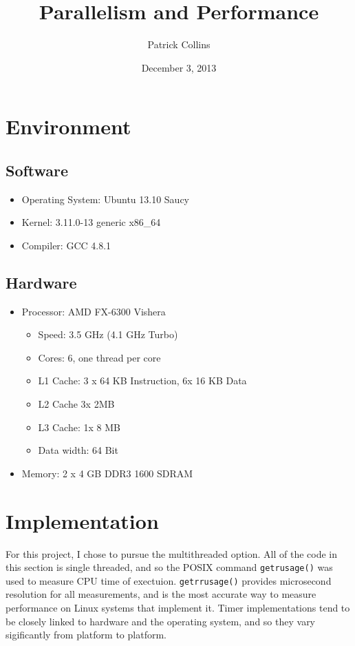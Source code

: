 \documentclass{article}
\begin{document}
\title{Parallelism and Performance}
\author{Patrick Collins}
\date{December 3, 2013}
\maketitle


\section{Environment}
\subsection{Software}
\begin{itemize}
  \item Operating System: Ubuntu 13.10 Saucy
  \item Kernel: 3.11.0-13 generic x86\_64
  \item Compiler: GCC 4.8.1
  \end{itemize}
\subsection{Hardware}
\begin{itemize}
\item Processor: AMD FX-6300 Vishera
  \begin{itemize}
  \item Speed: 3.5 GHz (4.1 GHz Turbo)
  \item Cores: 6, one thread per core
  \item L1 Cache: 3 x 64 KB Instruction, 6x 16 KB Data
  \item L2 Cache 3x 2MB
  \item L3 Cache: 1x 8 MB
  \item Data width: 64 Bit
  \end{itemize}
\item Memory: 2 x 4 GB DDR3 1600 SDRAM
\end{itemize}


\section{Implementation}
For this project, I chose to pursue the multithreaded option. All of
the code in this section is single threaded, and so the POSIX command
\texttt{getrusage()} was used to measure CPU time of
exectuion. \texttt{getrrusage()} provides microsecond resolution for
all measurements, and is the most accurate way to measure performance
on Linux systems that implement it. Timer implementations tend to be
closely linked to hardware and the operating system, and so they vary
sigificantly from platform to platform. 
\end{document}
